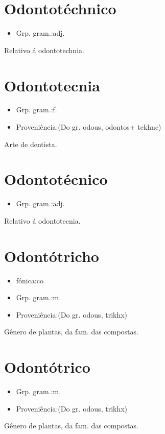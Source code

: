 \section{Odontotéchnico}
\begin{itemize}
\item {Grp. gram.:adj.}
\end{itemize}
Relativo á odontotechnia.
\section{Odontotecnia}
\begin{itemize}
\item {Grp. gram.:f.}
\end{itemize}
\begin{itemize}
\item {Proveniência:(Do gr. \textunderscore odous\textunderscore , \textunderscore odontos\textunderscore  + \textunderscore tekhne\textunderscore )}
\end{itemize}
Arte de dentista.
\section{Odontotécnico}
\begin{itemize}
\item {Grp. gram.:adj.}
\end{itemize}
Relativo á odontotecnia.
\section{Odontótricho}
\begin{itemize}
\item {fónica:co}
\end{itemize}
\begin{itemize}
\item {Grp. gram.:m.}
\end{itemize}
\begin{itemize}
\item {Proveniência:(Do gr. \textunderscore odous\textunderscore , \textunderscore trikhx\textunderscore )}
\end{itemize}
Gênero de plantas, da fam. das compostas.
\section{Odontótrico}
\begin{itemize}
\item {Grp. gram.:m.}
\end{itemize}
\begin{itemize}
\item {Proveniência:(Do gr. \textunderscore odous\textunderscore , \textunderscore trikhx\textunderscore )}
\end{itemize}
Gênero de plantas, da fam. das compostas.
